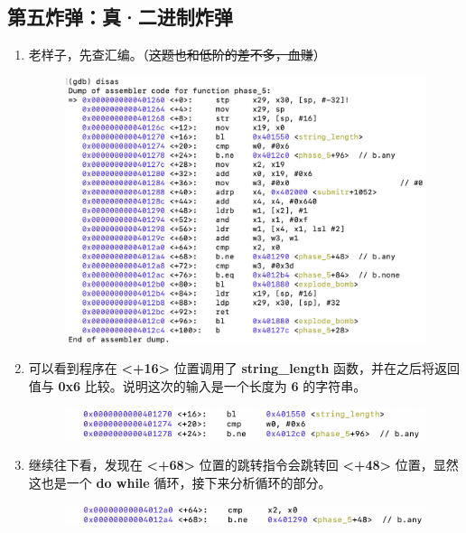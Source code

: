     \subsection{第五炸弹：真·二进制炸弹}
        \begin{enumerate}
            \item 老样子，先查汇编。（\sout{这题也和低阶的差不多，血赚}）
                \begin{figure}[htbp]
                    \hspace*{1.5cm}
                    \includegraphics*[width = 12cm]{s5_0.png}
                \end{figure}
            \item 可以看到程序在 \textbf{<+16>} 位置调用了 \textbf{string\_length} 函数，并在之后将返回值与 \textbf{0x6} 比较。说明这次的输入是一个长度为 \textbf{6} 的字符串。
                \begin{figure}[htbp]
                    \hspace*{1.5cm}
                    \includegraphics*[width = 12cm]{s5_1.png}
                \end{figure}
            \item 继续往下看，发现在 \textbf{<+68>} 位置的跳转指令会跳转回 \textbf{<+48>} 位置，显然这也是一个 \textbf{do while} 循环，接下来分析循环的部分。
                \begin{figure}[htbp]
                    \hspace*{1.5cm}
                    \includegraphics*[width = 12cm]{s5_2.png}

\end{figure}
\end{enumerate}
